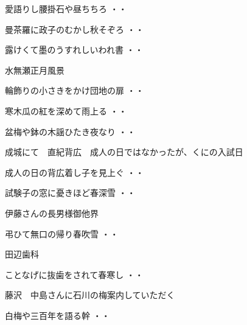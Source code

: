 \begin{shiika}愛語りし腰掛石や昼ちちろ
\hfill{・・}\end{shiika}
\vspace{ 0.4cm}
\begin{shiika}曼茶羅に政子のむかし秋そぞろ
\hfill{・・}\end{shiika}
\vspace{ 0.4cm}
\begin{shiika}露けくて墨のうすれしいわれ書
\hfill{・・}\end{shiika}
\vspace{ 0.4cm}
水無瀬正月風景
\begin{shiika}輪飾りの小さきをかけ団地の扉
\hfill{・・}\end{shiika}
\begin{shiika}寒木瓜の紅を深めて雨上る
\hfill{・・}\end{shiika}
\begin{shiika}盆梅や鉢の木謡ひたき夜なり
\hfill{・・}\end{shiika}
\vspace{ 0.4cm}
成城にて　直紀背広　成人の日ではなかったが、くにの入試日
\begin{shiika}成人の日の背広着し子を見上ぐ
\hfill{・・}\end{shiika}
\begin{shiika}試験子の窓に憂きほど春深雪
\hfill{・・}\end{shiika}
\vspace{ 0.4cm}
伊藤さんの長男様御他界
\begin{shiika}弔ひて無口の帰り春吹雪
\hfill{・・}\end{shiika}
\vspace{ 0.4cm}
田辺歯科
\begin{shiika}ことなげに抜歯をされて春寒し
\hfill{・・}\end{shiika}
\vspace{ 0.4cm}
藤沢　中島さんに石川の梅案内していただく
\begin{shiika}白梅や三百年を語る幹
\hfill{・・}\end{shiika}
